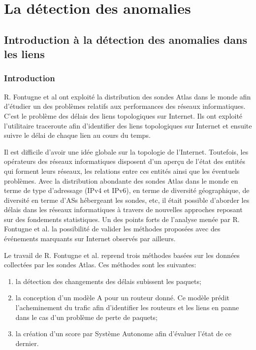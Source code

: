 \chapter{La détection des anomalies}

\section{Introduction à la détection des anomalies dans les liens}

\subsection{Introduction}

R. Fontugne et al ont exploité la distribution des sondes Atlas dans le monde afin d'étudier un des problèmes relatifs aux performances des réseaux informatiques. C'est le problème des délais des liens topologiques sur Internet.  Ils ont  exploité l'utilitaire traceroute afin d'identifier des liens topologiques sur Internet et ensuite suivre le délai de chaque lien au cours du temps.

Il est difficile d'avoir une idée globale sur la topologie de l'Internet. Toutefois, les opérateurs des réseaux informatiques disposent d'un aperçu de l'état des entités qui forment leurs réseaux, les relations entre ces entités ainsi que les éventuels problèmes. Avec la distribution abondante des sondes Atlas dans le monde en terme de type d'adressage (IPv4 et IPv6), en terme de diversité géographique, de diversité en terme d'ASs hébergeant les sondes, etc, il était possible d'aborder les délais dans les réseaux informatiques à travers de nouvelles approches reposant sur des fondements statistiques. Un des points forts de l'analyse menée par R. Fontugne et al. la possibilité de valider les méthodes proposées avec des événements marquants sur Internet observés par ailleurs.

Le travail de R. Fontugne et al. reprend trois méthodes basées sur les données collectées par les sondes Atlas. Ces méthodes sont les suivantes:


\begin{enumerate}
	\item la détection des changements des délais subissent les paquets;
	
	\item  la conception d'un modèle A pour un routeur donné. Ce modèle prédit l'acheminement du trafic afin d'identifier les routeurs et les liens en panne dans le cas d'un problème de perte de paquets;
	
	\item la création d'un score par Système Autonome afin d'évaluer l'état de ce dernier.
\end{enumerate}

